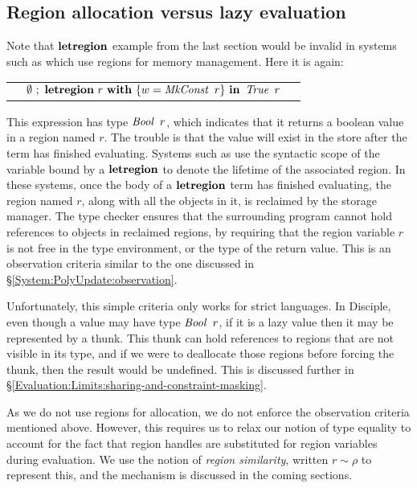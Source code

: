 \bigskip
\subsection{Region allocation versus lazy evaluation}
\label{Core:Language:lazy-evaluation}

Note that $\textrm{\textbf{letregion}}$ example from the last section would be invalid in systems such as \cite{tofte:region-inference} which use regions for memory management. Here it is again:

\medskip
\qq
\begin{tabular}{lll}
		& $\emptyset \ ; \ \kletregion \ r \ \kwith \ \{ w = \iMkConst \ r \} \ \kin \ \iTrue \ r$
\end{tabular}
\medskip

This expression has type $\iBool \ r$, which indicates that it returns a boolean value in a region named $r$. The trouble is that the value will exist in the store after the term has finished evaluating. Systems such as \cite{tofte:region-inference} use the syntactic scope of the variable bound by a $\textrm{\textbf{letregion}}$ to denote the lifetime of the associated region. In these systems, once the body of a $\textrm{\textbf{letregion}}$ term has finished evaluating, the region named $r$, along with all the objects in it, is reclaimed by the storage manager. The type checker ensures that the surrounding program cannot hold references to objects in reclaimed regions, by requiring that the region variable $r$ is not free in the type environment, or the type of the return value. This is an observation criteria similar to the one discussed in \S\ref{System:PolyUpdate:observation}.

Unfortunately, this simple criteria only works for strict languages. In Disciple, even though a value may have type $\iBool \ r$, if it is a lazy value then it may be represented by a thunk. This thunk can hold references to regions that are not visible in its type, and if we were to deallocate those regions before forcing the thunk, then the result would be undefined. This is discussed further in \S\ref{Evaluation:Limits:sharing-and-constraint-masking}.

As we do not use regions for allocation, we do not enforce the observation criteria mentioned above. However, this requires us to relax our notion of type equality to account for the fact that region handles are substituted for region variables during evaluation. We use the notion of \emph{region similarity}, written $r \sim \rho$ to represent this, and the mechanism is discussed in the coming sections.




